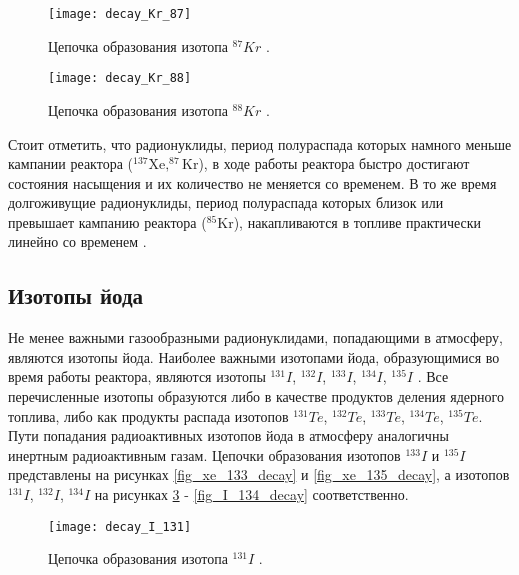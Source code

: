 \begin{figure}[ht!]
    \centering
    \texttt{[image: decay\_Kr\_87]}
    \captionsetup{justification=centering}
    \caption{Цепочка образования изотопа $^{87}Kr$ \cite{periodic_table}.}
    \label{fig_kr_87_decay}
\end{figure}

\begin{figure}[ht!]
    \centering
    \texttt{[image: decay\_Kr\_88]}
    \captionsetup{justification=centering}
    \caption{Цепочка образования изотопа $^{88}Kr$ \cite{periodic_table}.}
    \label{fig_kr_88_decay}
\end{figure}

Стоит отметить, что радионуклиды, период полураспада которых намного меньше кампании реактора ($^{137}\text{Xe}, 
^{87}\text{Kr}$), в ходе работы реактора быстро достигают состояния насыщения и их количество не меняется со временем. В 
то же время долгоживущие радионуклиды, период полураспада которых близок или превышает кампанию реактора 
($^{85}\text{Kr}$), накапливаются в топливе практически линейно со временем \cite{naumov_security}.



\subsection{Изотопы йода}

Не менее важными газообразными радионуклидами, попадающими в атмосферу, являются изотопы йода. Наиболее важными изотопами 
йода, образующимися во время работы реактора, являются изотопы $^{131}I$, $^{132}I$, $^{133}I$, $^{134}I$, $^{135}I$ 
\cite{gusev_bio}. Все перечисленные изотопы образуются либо в качестве продуктов деления ядерного топлива, либо как 
продукты распада изотопов $^{131}Te$, $^{132}Te$, $^{133}Te$, $^{134}Te$, $^{135}Te$. Пути попадания радиоактивных 
изотопов йода в атмосферу аналогичны инертным радиоактивным газам. Цепочки образования изотопов $^{133}I$ и $^{135}I$ 
представлены на рисунках \ref{fig_xe_133_decay} и \ref{fig_xe_135_decay}, а изотопов $^{131}I$, $^{132}I$, $^{134}I$ 
на рисунках \ref{fig_I_131_decay} - \ref{fig_I_134_decay} соответственно.

\begin{figure}[ht!]
    \centering
    \texttt{[image: decay\_I\_131]}
    \captionsetup{justification=centering}
    \caption{Цепочка образования изотопа $^{131}I$ \cite{periodic_table}.}
    \label{fig_I_131_decay}
\end{figure}

